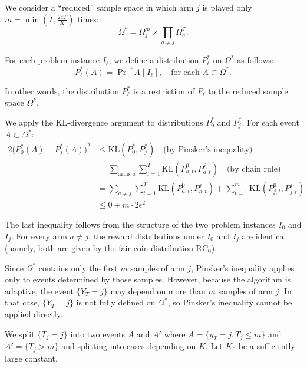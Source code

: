\documentclass[12pt]{article}
\begin{document}
\medskip

\noindent We consider a ``reduced'' sample space in which arm $j$ is played only 
$m = \min\!\left(T, \frac{24T}{K}\right)$ times:
\begin{equation}
\Omega^* = \Omega_j^m \times \prod_{a \ne j} \Omega_a^T.
\label{eq:reduced-sample-space}
\tag{4.6}
\end{equation}

\noindent  For each problem instance $I_\ell$, we define a distribution $P_\ell^*$ on $\Omega^*$ as follows:
\[
P_\ell^*(A) = \Pr[A \mid I_\ell], \quad \text{for each } A \subset \Omega^*.
\]

\noindent  In other words, the distribution $P_\ell^*$ is a restriction of $P_\ell$ to the reduced sample space $\Omega^*$.

\medskip

\noindent  We apply the KL-divergence argument to distributions $P_0^*$ and $P_j^*$. For each event $A \subset \Omega^*$:
\begin{align*}
2\big(P_0^*(A) - P_j^*(A)\big)^2 
&\le \mathrm{KL}(P_0^*, P_j^*) \quad \text{(by Pinsker's inequality)} \\
&= \sum_{\text{arms } a} \sum_{t=1}^T \mathrm{KL}(P_{a,t}^0, P_{a,t}^j)
\quad \text{(by chain rule)} \\
&= \sum_{a \ne j} \sum_{t=1}^T \mathrm{KL}(P_{a,t}^0, P_{a,t}^j)
+ \sum_{t=1}^m \mathrm{KL}(P_{j,t}^0, P_{j,t}^j) \\
&\le 0 + m \cdot 2\epsilon^2
\end{align*}

\noindent The last inequality follows from the structure of the two problem instances $I_0$ and $I_j$.  For every arm $a \ne j$, the reward distributions under $I_0$ and $I_j$ are identical (namely, both are given by the fair coin distribution $\mathrm{RC}_0$). 

\vspace{5mm}

\noindent Since $\Omega^*$ contains only the first $m$ samples of arm $j$, Pinsker's inequality applies only to events determined by those samples. However, because the algorithm is adaptive, the event $\{Y_T=j\}$ may depend on more than $m$ samples of arm $j$. In that case, $\{Y_T=j\}$ is not fully defined on $\Omega^*$, so Pinsker's inequality cannot be applied directly.

\vspace{5mm}

We split $\{T_j=j\}$ into two events $A$ and $A'$ where $A=\{y_T=j, T_j\le m\}$ and  $A'=\{T_j>m\}$ and splitting into cases depending on $K$. Let $K_0$ be a sufficiently large constant. 
\end{document}
